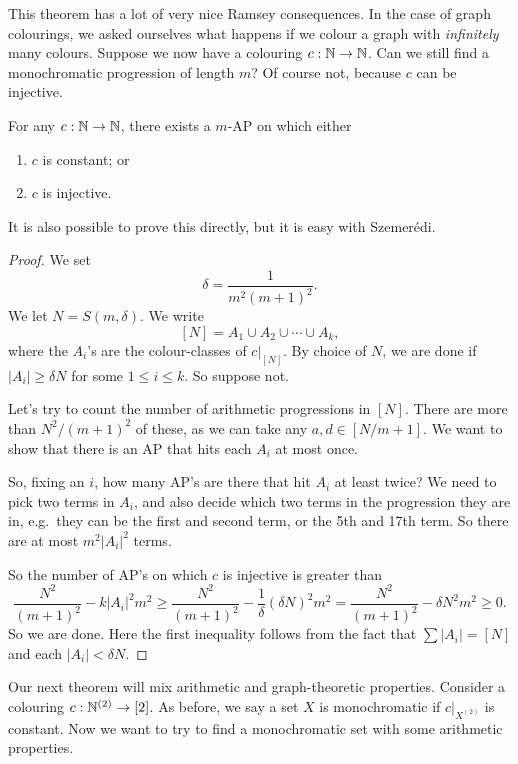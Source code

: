 \documentclass[a4paper]{article}
\begin{document}
  This theorem has a lot of very nice Ramsey consequences. In the case of graph colourings, we asked ourselves what happens if we colour a graph with \emph{infinitely} many colours. Suppose we now have a colouring $c: \mathbb{N} \to \mathbb{N}$. Can we still find a monochromatic progression of length $m$? Of course not, because $c$ can be injective.

  \begin{thm}
    For any $c: \mathbb{N} \to \mathbb{N}$, there exists a $m$-AP on which either
    \begin{enumerate}
    \item $c$ is constant; or
    \item $c$ is injective.
    \end{enumerate}
  \end{thm}
  It is also possible to prove this directly, but it is easy with Szemer\'edi.

  \begin{proof}
    We set
    \[
      \delta = \frac{1}{m^2(m + 1)^2}.
    \]
    We let $N = S(m, \delta)$. We write
    \[
      [N] = A_1 \cup A_2 \cup \cdots \cup A_k,
    \]
    where the $A_i$'s are the colour-classes of $c|_{[N]}$. By choice of $N$, we are done if $|A_i| \geq \delta N$ for some $1 \leq i \leq k$. So suppose not.

    Let's try to count the number of arithmetic progressions in $[N]$. There are more than $N^2/(m + 1)^2$ of these, as we can take any $a, d \in [N/m + 1]$. We want to show that there is an AP that hits each $A_i$ at most once.

    So, fixing an $i$, how many AP's are there that hit $A_i$ at least twice? We need to pick two terms in $A_i$, and also decide which two terms in the progression they are in, e.g.\ they can be the first and second term, or the 5th and 17th term. So there are at most $m^2 |A_i|^2$ terms.

    So the number of AP's on which $c$ is injective is greater than
    \[
      \frac{N^2}{(m + 1)^2} - k |A_i|^2 m^2 \geq \frac{N^2}{(m + 1)^2} - \frac{1}{\delta} (\delta N)^2 m^2 = \frac{N^2}{(m + 1)^2} - \delta N^2 m^2 \geq 0.
    \]
    So we are done. Here the first inequality follows from the fact that $\sum |A_i| = [N]$ and each $|A_i| < \delta N$.
  \end{proof}

  Our next theorem will mix arithmetic and graph-theoretic properties. Consider a colouring $c: \mathbb{N}^{(2)} \to [2]$. As before, we say a set $X$ is monochromatic if $c|_{X^{(2)}}$ is constant. Now we want to try to find a monochromatic set with some arithmetic properties.
\end{document}
